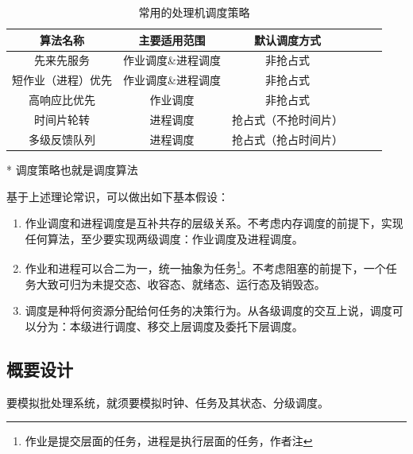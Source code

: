 \documentclass[12pt, a4paper, UTF8]{ctexart}
\begin{document}
\begin{table}[htbp]
    \caption{常用的处理机调度策略}
    \centering

    \begin{threeparttable}
        \begin{tabular}{cccccc}
            \toprule
            算法名称           & 主要适用范围       & 默认调度方式         \\
            \midrule
            先来先服务         & 作业调度\&进程调度 & 非抢占式             \\
            短作业（进程）优先 & 作业调度\&进程调度 & 非抢占式             \\
            高响应比优先       & 作业调度           & 非抢占式             \\
            时间片轮转         & 进程调度           & 抢占式（不抢时间片） \\
            多级反馈队列       & 进程调度           & 抢占式（抢占时间片） \\
            \bottomrule
        \end{tabular}

        \begin{tablenotes}
            \item [*]   调度策略也就是调度算法
        \end{tablenotes}

    \end{threeparttable}
    \qquad
\end{table}
基于上述理论常识，可以做出如下基本假设：
\begin{enumerate}
    \item 作业调度和进程调度是互补共存的层级关系。不考虑内存调度的前提下，实现任何算法，至少要实现两级调度：作业调度及进程调度。
    \item 作业和进程可以合二为一，统一抽象为任务\footnote{作业是提交层面的任务，进程是执行层面的任务，作者注}。不考虑阻塞的前提下，一个任务大致可归为未提交态、收容态、就绪态、运行态及销毁态。
    \item 调度是种将何资源分配给何任务的决策行为。从各级调度的交互上说，调度可以分为：本级进行调度、移交上层调度及委托下层调度。
\end{enumerate}

\subsection{概要设计} \label{v0}

要模拟批处理系统，就须要模拟时钟、任务及其状态、分级调度。
\end{document}
